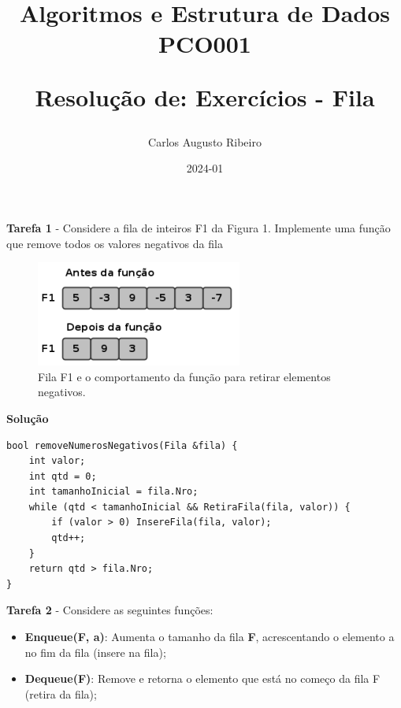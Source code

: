 \documentclass{article}
\title{
Algoritmos e Estrutura de Dados PCO001

Resolução de: \textbf{Exercícios - Fila}
}
\author{Carlos Augusto Ribeiro}
\date{2024-01}
\begin{document}
\maketitle

\par
\noindent
\textbf{Tarefa 1} -  Considere a fila de inteiros F1 da Figura 1. Implemente uma função que remove todos os valores negativos da fila

\begin{figure}[h!]
    \clearpage
    \centering
    \includegraphics[width=0.5\linewidth]{fila/1.PNG}
    \caption{Fila F1 e o comportamento da função para retirar elementos negativos.}
\end{figure}

\bigskip
\par
\noindent
\textbf{Solução}
\begin{lstlisting}
bool removeNumerosNegativos(Fila &fila) {
    int valor;
    int qtd = 0;
    int tamanhoInicial = fila.Nro;
    while (qtd < tamanhoInicial && RetiraFila(fila, valor)) {
        if (valor > 0) InsereFila(fila, valor);
        qtd++;
    }
    return qtd > fila.Nro;
}
\end{lstlisting}

\bigskip

\par
\noindent
\textbf{Tarefa 2} - Considere as seguintes funções:
\begin{itemize}
    \item \textbf{Enqueue(F, a)}: Aumenta o tamanho da fila \textbf{F}, acrescentando o elemento a no fim da fila (insere na fila);
    \item \textbf{Dequeue(F)}: Remove e retorna o elemento que está no começo da fila F (retira da fila);
\end{itemize}
\end{document}
